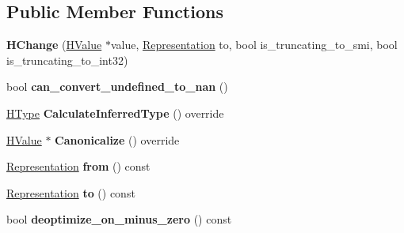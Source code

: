 \subsection*{Public Member Functions}
\begin{DoxyCompactItemize}
\item 
{\bfseries H\+Change} (\hyperlink{classv8_1_1internal_1_1_h_value}{H\+Value} $\ast$value, \hyperlink{classv8_1_1internal_1_1_representation}{Representation} to, bool is\+\_\+truncating\+\_\+to\+\_\+smi, bool is\+\_\+truncating\+\_\+to\+\_\+int32)\hypertarget{classv8_1_1internal_1_1_h_change_a5b4e7350ccffaad82fc1e2204ac8dc11}{}\label{classv8_1_1internal_1_1_h_change_a5b4e7350ccffaad82fc1e2204ac8dc11}

\item 
bool {\bfseries can\+\_\+convert\+\_\+undefined\+\_\+to\+\_\+nan} ()\hypertarget{classv8_1_1internal_1_1_h_change_ab46800c7044f94e4254512c157aa52cb}{}\label{classv8_1_1internal_1_1_h_change_ab46800c7044f94e4254512c157aa52cb}

\item 
\hyperlink{classv8_1_1internal_1_1_h_type}{H\+Type} {\bfseries Calculate\+Inferred\+Type} () override\hypertarget{classv8_1_1internal_1_1_h_change_af2e7909db29ce401d9643c604af2ea90}{}\label{classv8_1_1internal_1_1_h_change_af2e7909db29ce401d9643c604af2ea90}

\item 
\hyperlink{classv8_1_1internal_1_1_h_value}{H\+Value} $\ast$ {\bfseries Canonicalize} () override\hypertarget{classv8_1_1internal_1_1_h_change_adc86c7336a395d4ae2567106bf6f4584}{}\label{classv8_1_1internal_1_1_h_change_adc86c7336a395d4ae2567106bf6f4584}

\item 
\hyperlink{classv8_1_1internal_1_1_representation}{Representation} {\bfseries from} () const \hypertarget{classv8_1_1internal_1_1_h_change_a73f4c767e97e0f57d18934dc0489decb}{}\label{classv8_1_1internal_1_1_h_change_a73f4c767e97e0f57d18934dc0489decb}

\item 
\hyperlink{classv8_1_1internal_1_1_representation}{Representation} {\bfseries to} () const \hypertarget{classv8_1_1internal_1_1_h_change_a2693c4bea6fbe0d805a3ec4c705f3f08}{}\label{classv8_1_1internal_1_1_h_change_a2693c4bea6fbe0d805a3ec4c705f3f08}

\item 
bool {\bfseries deoptimize\+\_\+on\+\_\+minus\+\_\+zero} () const \hypertarget{classv8_1_1internal_1_1_h_change_a73f752aab3ed74359034bb9d969cdd76}{}\label{classv8_1_1internal_1_1_h_change_a73f752aab3ed74359034bb9d969cdd76}


\end{DoxyCompactItemize}
